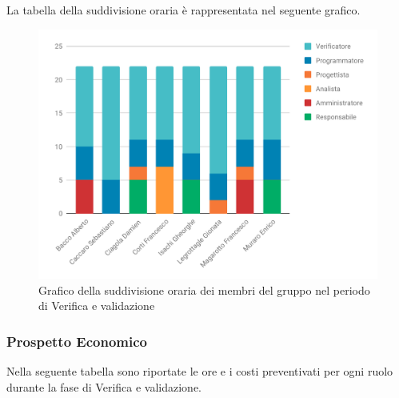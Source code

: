 La tabella della suddivisione oraria è rappresentata nel seguente grafico.
\begin{figure}[H]
	\includegraphics[width=1\linewidth]{Preventivo/grafici/VV1_1.pdf}
	\caption{Grafico della suddivisione oraria dei membri del gruppo nel periodo di Verifica e validazione}
\end{figure}

\subsubsection{Prospetto Economico}
Nella seguente tabella sono riportate le ore e i costi preventivati per ogni ruolo durante la fase di Verifica e validazione.


